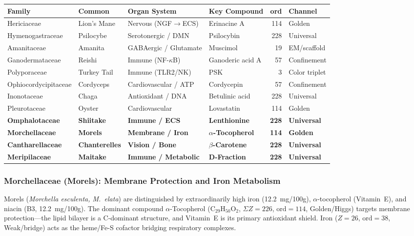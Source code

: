 \begin{center}
{\small
\begin{tabular}{@{}llllrl@{}}
\toprule
\textbf{Family} & \textbf{Common} & \textbf{Organ System} & \textbf{Key Compound} & \textbf{ord} & \textbf{Channel} \\
\midrule
Hericiaceae      & Lion's Mane  & Nervous (NGF$\to$ECS) & Erinacine A        & 114 & Golden \\
Hymenogastraceae & Psilocybe    & Serotonergic / DMN    & Psilocybin         & 228 & Universal \\
Amanitaceae      & Amanita      & GABAergic / Glutamate & Muscimol           &  19 & EM/scaffold \\
Ganodermataceae  & Reishi       & Immune (NF-$\kappa$B) & Ganoderic acid A   &  57 & Confinement \\
Polyporaceae     & Turkey Tail  & Immune (TLR2/NK)      & PSK                &   3 & Color triplet \\
Ophiocordycipitaceae & Cordyceps & Cardiovascular / ATP & Cordycepin         &  57 & Confinement \\
Inonotaceae      & Chaga        & Antioxidant / DNA     & Betulinic acid     & 228 & Universal \\
Pleurotaceae     & Oyster       & Cardiovascular        & Lovastatin         & 114 & Golden \\
\textbf{Omphalotaceae} & \textbf{Shiitake} & \textbf{Immune / ECS} & \textbf{Lenthionine} & \textbf{228} & \textbf{Universal} \\
\textbf{Morchellaceae}  & \textbf{Morels}   & \textbf{Membrane / Iron} & \textbf{$\alpha$-Tocopherol} & \textbf{114} & \textbf{Golden} \\
\textbf{Cantharellaceae} & \textbf{Chanterelles} & \textbf{Vision / Bone} & \textbf{$\beta$-Carotene} & \textbf{228} & \textbf{Universal} \\
\textbf{Meripilaceae} & \textbf{Maitake} & \textbf{Immune / Metabolic} & \textbf{D-Fraction} & \textbf{228} & \textbf{Universal} \\
\bottomrule
\end{tabular}
}
\end{center}

\subsubsection{Morchellaceae (Morels): Membrane Protection and Iron Metabolism}

Morels (\emph{Morchella esculenta, M.\ elata}) are distinguished by
extraordinarily high iron (12.2~mg/100g), $\alpha$-tocopherol (Vitamin~E),
and niacin (B3, 12.2~mg/100g). The dominant compound
$\alpha$-Tocopherol ($\mathrm{C}_{29}\mathrm{H}_{50}\mathrm{O}_2$,
$\Sigma Z = 226$, $\mathrm{ord} = 114$, Golden/Higgs) targets membrane
protection---the lipid bilayer is a C-dominant structure, and Vitamin~E
is its primary antioxidant shield. Iron ($Z = 26$, $\mathrm{ord} = 38$,
Weak/bridge) acts as the heme/Fe-S cofactor bridging respiratory complexes.

